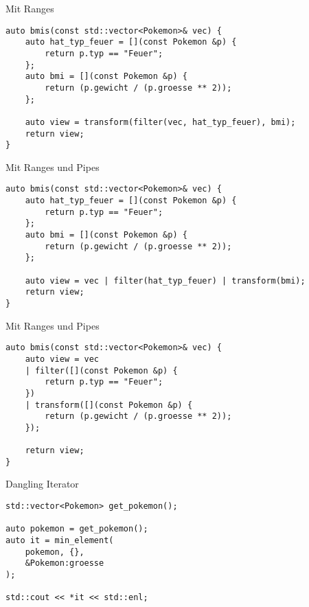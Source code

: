 
\begin{frame}[fragile]{Mit Ranges}
    \begin{verbatim}
auto bmis(const std::vector<Pokemon>& vec) {
    auto hat_typ_feuer = [](const Pokemon &p) {
        return p.typ == "Feuer";
    };
    auto bmi = [](const Pokemon &p) {
        return (p.gewicht / (p.groesse ** 2));
    };
    
    auto view = transform(filter(vec, hat_typ_feuer), bmi);
    return view;
}
\end{verbatim}
\end{frame}

\begin{frame}[fragile]{Mit Ranges und Pipes}
    \begin{verbatim}
auto bmis(const std::vector<Pokemon>& vec) {
    auto hat_typ_feuer = [](const Pokemon &p) {
        return p.typ == "Feuer";
    };
    auto bmi = [](const Pokemon &p) {
        return (p.gewicht / (p.groesse ** 2));
    };

    auto view = vec | filter(hat_typ_feuer) | transform(bmi);
    return view;
}
    \end{verbatim}
\end{frame}

\begin{frame}[fragile]{Mit Ranges und Pipes}
    \begin{verbatim}
auto bmis(const std::vector<Pokemon>& vec) {
    auto view = vec
    | filter([](const Pokemon &p) {
        return p.typ == "Feuer";
    })
    | transform([](const Pokemon &p) {
        return (p.gewicht / (p.groesse ** 2));
    });

    return view;
}
    \end{verbatim}
\end{frame}

\begin{frame}[fragile]{Dangling Iterator}
    \begin{overlayarea}{\linewidth}{6cm}
        \begin{verbatim}
std::vector<Pokemon> get_pokemon();

auto pokemon = get_pokemon();
auto it = min_element(
    pokemon, {},
    &Pokemon:groesse
);

std::cout << *it << std::enl;
        \end{verbatim}
    \end{overlayarea}
\end{frame}

